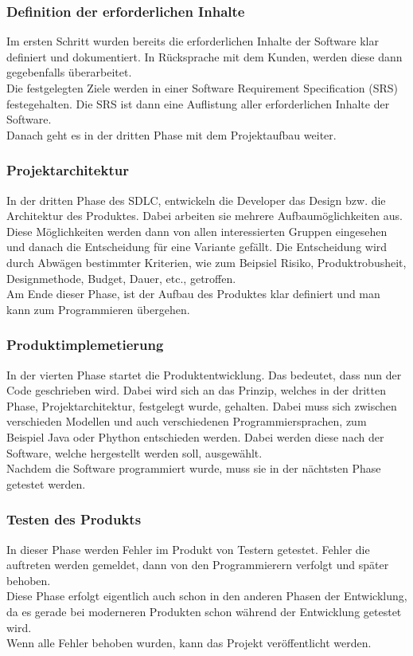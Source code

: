 \documentclass[a4paper, 10pt]{scrartcl}
\begin{document}
\subsubsection{Definition der erforderlichen Inhalte}
Im ersten Schritt wurden bereits die erforderlichen Inhalte der Software klar definiert und dokumentiert. In Rücksprache mit dem Kunden, werden diese dann gegebenfalls überarbeitet.\\
Die festgelegten Ziele werden in einer \glqq Software Requirement Specification (SRS)\grqq{} festegehalten. Die SRS ist dann eine Auflistung aller erforderlichen Inhalte der Software. \citep{stoica}\\
Danach geht es in der dritten Phase mit dem Projektaufbau weiter.
\subsubsection{Projektarchitektur}
In der dritten Phase des SDLC, entwickeln die Developer das Design bzw. die Architektur des Produktes. Dabei arbeiten sie mehrere Aufbaumöglichkeiten aus. Diese Möglichkeiten werden dann von allen interessierten Gruppen eingesehen und danach die Entscheidung für eine Variante gefällt. Die Entscheidung wird durch Abwägen bestimmter Kriterien, wie zum Beipsiel Risiko, Produktrobusheit, Designmethode, Budget, Dauer, etc., getroffen. \citep{stoica}\\
Am Ende dieser Phase, ist der Aufbau des Produktes klar definiert und man kann zum Programmieren übergehen.
\subsubsection{Produktimplemetierung}
In der vierten Phase startet die Produktentwicklung. Das bedeutet, dass nun der Code geschrieben wird. Dabei wird sich an das Prinzip, welches in der dritten Phase, Projektarchitektur, festgelegt wurde, gehalten. Dabei muss sich zwischen verschieden Modellen und auch verschiedenen Programmiersprachen, zum Beispiel Java oder Phython entschieden werden. Dabei werden diese nach der Software, welche hergestellt werden soll, ausgewählt.\citep{stoica}\\
Nachdem die Software programmiert wurde, muss sie in der nächtsten Phase getestet werden.
\subsubsection{Testen des Produkts}
In dieser Phase werden Fehler im Produkt von Testern getestet. Fehler die auftreten werden gemeldet, dann von den Programmierern verfolgt und später behoben. \\ 
Diese Phase erfolgt eigentlich auch schon in den anderen Phasen der Entwicklung, da es gerade bei moderneren Produkten schon während der Entwicklung getestet wird. \citep{stoica}\\
Wenn alle Fehler behoben wurden, kann das Projekt veröffentlicht werden.
\end{document}
